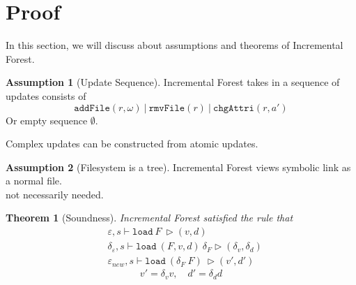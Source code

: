 \documentclass[10pt,twoside,a4paper]{article}
\theoremstyle{theorem}
\newtheorem{theorem}{Theorem}[section]
\theoremstyle{lemma}
\theoremstyle{property}
\theoremstyle{definition}
\theoremstyle{assumption}
\newtheorem{assumption}{Assumption}[section]
\def\snd{\pi_2}
\begin{document}
\begin{comment}
\begin{displaymath}
	\frac{\begin{array}{c}
	\forall n \in \llbracket e \rrbracket^{\varepsilon_{new}}_{\{Path\}} \cap \llbracket e \rrbracket^{\varepsilon_{old}}_{\{Path\}}, ~ v = vs(n), ~d = ds(n)\\
	(\delta_\varepsilon, r \mapsto (r/n, \emptyset)), s \vdash \mathtt{load}_\Delta (F,v,d)~ u \rhd (\delta_v,\delta_d)
	\end{array}}
	{\mathtt{changeVOf}(n) = \mathtt{mod}((n,v), \snd\delta_v), ~~\mathtt{changeDOf}(n) = \mathtt{mod}((n,d), \snd\delta_d)}
\end{displaymath}
If the filename $n$ is preserved in both environments, Incremental Forest delta-load the file recursively. One thing to notice here is that we append the name $n$ directly to the filepath $r$. Because in either old or new environment, the expression $e$ can always be evaluated to this $r/n$ filepath, in this level of recursion, we don't need to record the change in filepath. This makes the delta environment clear of unexpected change on variables.
\end{comment}

\newpage
\section{Proof}
In this section, we will discuss about assumptions and theorems of Incremental Forest.
\begin{assumption}[Update Sequence]
	Incremental Forest takes in a sequence of updates consists of 
	\begin{displaymath}
		\mathtt{addFile}(r,\omega) ~|~ \mathtt{rmvFile}(r) ~|~ \mathtt{chgAttri}(r,a')
	\end{displaymath}
	Or empty sequence $\emptyset$.
\end{assumption}

Complex updates can be constructed from atomic updates.

\begin{assumption}[Filesystem is a tree]
	Incremental Forest views symbolic link as a normal file. \\
	not necessarily needed.
\end{assumption}

\begin{theorem}[Soundness]
	Incremental Forest satisfied the rule that
	\begin{align*}
		& \varepsilon, s \vdash \mathtt{load}~ F~ \rhd (v,d)\\
		& \delta_\varepsilon, s \vdash \mathtt{load}~ (F,v,d)~ \delta_F \rhd (\delta_v,\delta_d)\\
		& \varepsilon_{new}, s \vdash \mathtt{load}~ (\delta_F~F)~ \rhd (v',d')
	\end{align*}
	\begin{displaymath}
		v' = \delta_v v, \quad d' = \delta_d d
	\end{displaymath}
\end{theorem}
\end{document}
